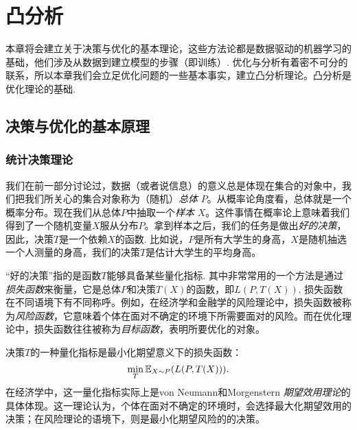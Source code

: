 \chapter{凸分析}\label{chap:convex-analysis}

本章将会建立关于决策与优化的基本理论，这些方法论都是数据驱动的机器学习的基础，他们涉及从数据到建立模型的步骤（即训练）. 优化与分析有着密不可分的联系，所以本章我们会立足优化问题的一些基本事实，建立凸分析理论。凸分析是优化理论的基础.

\section{决策与优化的基本原理}
\subsection{统计决策理论}

我们在前一部分讨论过，数据（或者说信息）的意义总是体现在集合的对象中，我们把我们所关心的集合对象称为（随机）\emph{总体} $P$。从概率论角度看，总体就是一个概率分布。现在我们从总体$P$中抽取一个\emph{样本} $X$。这件事情在概率论上意味着我们得到了一个随机变量$X$服从分布$P$。拿到样本之后，我们的任务是做出\emph{好的决策}，因此，决策$T$是一个依赖$X$的函数. 比如说，$P$是所有大学生的身高，$X$是随机抽选一个人测量的身高，我们的决策$T$是估计大学生的平均身高。

“好的决策”指的是函数$T$能够具备某些量化指标. 其中非常常用的一个方法是通过\emph{损失函数}来衡量，它是总体$P$和决策$T(X)$的函数，即$L(P,T(X))$. 损失函数在不同语境下有不同称呼。例如，在经济学和金融学的风险理论中，损失函数被称为\emph{风险函数}，它意味着个体在面对不确定的环境下所需要面对的风险。而在优化理论中，损失函数往往被称为\emph{目标函数}，表明所要优化的对象。

决策$T$的一种量化指标是最小化期望意义下的损失函数：
    \[\min_{T}\mathbb{E}_{X\sim P}(L(P,T(X))).\]
在经济学中，这一量化指标实际上是von Neumann和Morgenstern \emph{期望效用理论}的具体体现。这一理论认为，个体在面对不确定的环境时，会选择最大化期望效用的决策；在风险理论的语境下，则是最小化期望风险的的决策。

